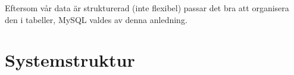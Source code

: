 \documentclass[a4paper,12pt]{article}
\begin{document}

Eftersom vår data är strukturerad (inte flexibel) passar det bra att organisera den i tabeller, MySQL valdes av denna anledning.




\section{Systemstruktur}
\label{sec:systemstruktur}

\end{document}
